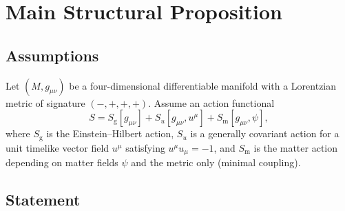 \documentclass[12pt,a4paper]{article}
\newcommand{\EH}{S_{\mathrm{g}}}
\newcommand{\Su}{S_{u}}
\newcommand{\Sm}{S_{\mathrm{m}}}
\begin{document}
\section{Main Structural Proposition}
\label{sec:proposition}


\subsection{Assumptions}

Let $(M,g_{\mu\nu})$ be a four-dimensional differentiable manifold with a
Lorentzian metric of signature $(-,+,+,+)$. Assume an action functional
\begin{equation}
  S = \EH[g_{\mu\nu}]+\Su[g_{\mu\nu},u^{\mu}]+\Sm[g_{\mu\nu},\psi],
  \label{eq:total_action}
\end{equation}
where $\EH$ is the Einstein--Hilbert action, $\Su$ is a generally covariant
action for a unit timelike vector field $u^{\mu}$ satisfying
$u^{\mu}u_{\mu}=-1$, and $\Sm$ is the matter action depending on matter
fields $\psi$ and the metric only (minimal coupling).

\subsection{Statement}
\end{document}
